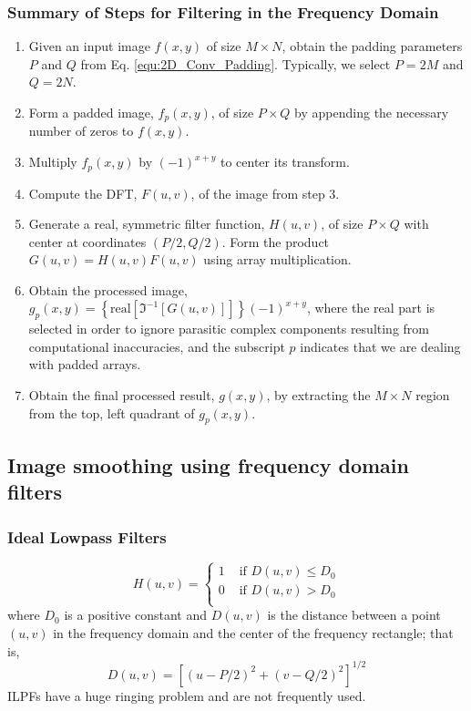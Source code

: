 \subsubsection{Summary of Steps for Filtering in the Frequency Domain }
  
\begin{enumerate}
	\item Given an input image $f(x,y)$ of size $M \times N$, obtain the padding parameters $P$ and $Q$ from Eq. \ref{equ:2D_Conv_Padding}. Typically, we select $P=2M$ and $Q=2N$.
	\item Form a padded image, $f_p(x,y)$, of size $P \times Q$ by appending the necessary number of zeros to $f(x,y)$.
	\item Multiply $f_p(x,y)$ by $(-1)^{x+y}$ to center its transform.
	\item Compute the DFT, $F(u,v)$, of the image from step 3.
	\item Generate a real, symmetric filter function, $H(u,v)$, of size $P \times Q$ with center at coordinates $(P/2,Q/2)$. Form the product $G(u,v) = H(u,v) F(u,v)$ using array multiplication.
	\item Obtain the processed image, $g_p(x,y) = \left\lbrace \text{real} \left[ \Im^{-1} \left[ G(u,v) \right] \right] \right\rbrace (-1)^{x+y}$, where the real part is selected in order to ignore parasitic complex components resulting from computational inaccuracies, and the subscript $p$ indicates that we are dealing with padded arrays.
	\item Obtain the final processed result, $g(x,y)$, by extracting the $M \times N$ region from the top, left quadrant of $g_p(x,y)$.
\end{enumerate}

\subsection{Image smoothing using frequency domain filters }
\subsubsection{Ideal Lowpass Filters}
\begin{equation}
	H(u,v)  = 
		\begin{cases}
			1 & \text{  if } D(u,v) \leq D_0 \\
			0 & \text{  if } D(u,v) > D_0 \\ 
		\end{cases}
\end{equation}
where $D_0$ is a positive constant and $D(u,v)$ is the distance between a point $(u,v)$ in the frequency domain and the center of the frequency rectangle; that is,
\begin{equation}
	D(u,v) = \left[ (u-P/2)^2 + (v-Q/2)^2 \right]^{1/2}
	\label{equ:Freq_Filter_D_uv}
\end{equation}
ILPFs have a huge ringing problem and are not frequently used.

